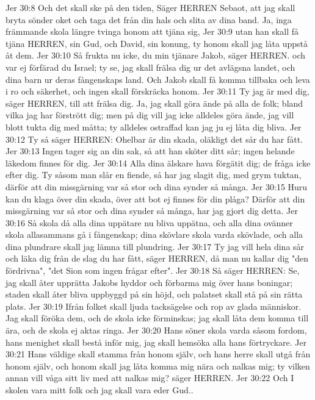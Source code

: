 Jer 30:8  Och det skall ske på den tiden, Säger HERREN Sebaot, att jag skall bryta sönder oket och taga det från din hals och slita av dina band. Ja, inga främmande skola längre tvinga honom att tjäna sig,
Jer 30:9  utan han skall få tjäna HERREN, sin Gud, och David, sin konung, ty honom skall jag låta uppstå åt dem.
Jer 30:10  Så frukta nu icke, du min tjänare Jakob, säger HERREN. och var ej förfärad du Israel; ty se, jag skall frälsa dig ur det avlägsna landet, och dina barn ur deras fångenskaps land. Och Jakob skall få komma tillbaka och leva i ro och säkerhet, och ingen skall förskräcka honom.
Jer 30:11  Ty jag är med dig, säger HERREN, till att frälsa dig. Ja, jag skall göra ände på alla de folk; bland vilka jag har förstrött dig; men på dig vill jag icke alldeles göra ände, jag vill blott tukta dig med måtta; ty alldeles ostraffad kan jag ju ej låta dig bliva.
Jer 30:12  Ty så säger HERREN: Ohelbar är din skada, oläkligt det sår du har fått.
Jer 30:13  Ingen tager sig an din sak, så att han sköter ditt sår; ingen helande läkedom finnes för dig.
Jer 30:14  Alla dina älskare hava förgätit dig; de fråga icke efter dig. Ty såsom man slår en fiende, så har jag slagit dig, med grym tuktan, därför att din missgärning var så stor och dina synder så många.
Jer 30:15  Huru kan du klaga över din skada, över att bot ej finnes för din plåga? Därför att din missgärning var så stor och dina synder så många, har jag gjort dig detta.
Jer 30:16  Så skola då alla dina uppätare nu bliva uppätna, och alla dina ovänner skola allasammans gå i fångenskap; dina skövlare skola varda skövlade, och alla dina plundrare skall jag lämna till plundring.
Jer 30:17  Ty jag vill hela dina sår och läka dig från de slag du har fått, säger HERREN, då man nu kallar dig "den fördrivna", "det Sion som ingen frågar efter".
Jer 30:18  Så säger HERREN: Se, jag skall åter upprätta Jakobs hyddor och förbarma mig över hans boningar; staden skall åter bliva uppbyggd på sin höjd, och palatset skall stå på sin rätta plats.
Jer 30:19  Ifrån folket skall ljuda tacksägelse och rop av glada människor. Jag skall föröka dem, och de skola icke förminskas; jag skall låta dem komma till ära, och de skola ej aktas ringa.
Jer 30:20  Hans söner skola varda såsom fordom, hans menighet skall bestå inför mig, jag skall hemsöka alla hans förtryckare.
Jer 30:21  Hans väldige skall stamma från honom själv, och hans herre skall utgå från honom själv, och honom skall jag låta komma mig nära och nalkas mig; ty vilken annan vill våga sitt liv med att nalkas mig? säger HERREN.
Jer 30:22  Och I skolen vara mitt folk och jag skall vara eder Gud..
